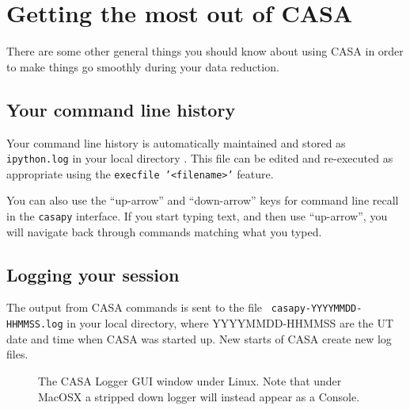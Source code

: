 \section{Getting the most out of CASA}
\label{section:intro.common}

There are some other general things you should know about using
CASA in order to make things go smoothly during your data reduction.

\subsection{Your command line history}
\label{section:intro.common.commands}

Your command line history is automatically maintained and stored 
as {\tt ipython.log} in your local directory . This file can be edited and
re-executed as appropriate using the {\tt execfile '<filename>'}
feature.

You can also use the ``up-arrow'' and ``down-arrow'' keys for command line
recall in the {\tt casapy} interface.  If you start typing text, and
then use ``up-arrow'', you will navigate back through commands
matching what you typed.

\subsection{Logging your session}
\label{section:intro.common.logger}

The output from CASA commands is sent to the file {\tt
  casapy-YYYYMMDD-HHMMSS.log} in your local directory, where
YYYYMMDD-HHMMSS are the UT date and time when CASA was started up. New
starts of CASA create new log files. 


\begin{figure}[h!]
\begin{center}
\caption{\label{fig:casalogger1} The CASA Logger GUI window under
Linux. Note that under MacOSX a stripped down logger will instead
appear as a Console.}
\hrulefill
\end{center}
\end{figure}

